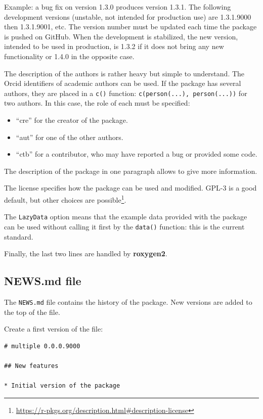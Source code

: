 \documentclass[
  12pt,
  american,
  a4paper,
  extrafontsizes,onecolumn,openright
  ]{memoir}
\providecommand{\tightlist}{%
  \setlength{\itemsep}{0pt}\setlength{\parskip}{0pt}}
\begin{document}
Example: a bug fix on version 1.3.0 produces version 1.3.1.
The following development versions (unstable, not intended for production use) are 1.3.1.9000 then 1.3.1.9001, etc.
The version number must be updated each time the package is pushed on GitHub.
When the development is stabilized, the new version, intended to be used in production, is 1.3.2 if it does not bring any new functionality or 1.4.0 in the opposite case.

The description of the authors is rather heavy but simple to understand.
The Orcid identifiers of academic authors can be used.
If the package has several authors, they are placed in a \texttt{c()} function: \texttt{c(person(...),\ person(...))} for two authors.
In this case, the role of each must be specified:

\begin{itemize}
\tightlist
\item
  \enquote{cre} for the creator of the package.
\item
  \enquote{aut} for one of the other authors.
\item
  \enquote{ctb} for a contributor, who may have reported a bug or provided some code.
\end{itemize}

The description of the package in one paragraph allows to give more information.

The license specifies how the package can be used and modified.
GPL-3 is a good default, but other choices are possible\footnote{\url{https://r-pkgs.org/description.html\#description-license}}.

The \texttt{LazyData} option means that the example data provided with the package can be used without calling it first by the \texttt{data()} function: this is the current standard.

Finally, the last two lines are handled by \textbf{roxygen2}.

\subsection{NEWS.md file}\label{news.md-file}

The \texttt{NEWS.md} file contains the history of the package.
New versions are added to the top of the file.

Create a first version of the file:

\begin{verbatim}
# multiple 0.0.0.9000

## New features

* Initial version of the package
\end{verbatim}
\end{document}
